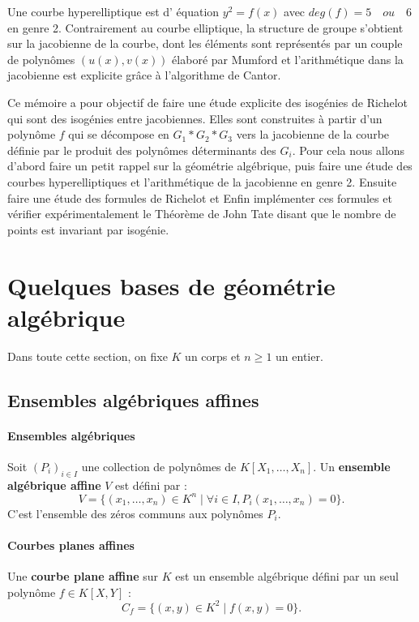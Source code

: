\documentclass[12pt,a4paper]{article}
\begin{document}
	Une courbe hyperelliptique est d' équation $y^2= f(x)$ avec $deg(f) = 5\quad ou \quad 6$ en genre 2. Contrairement au courbe elliptique, la structure de groupe s'obtient sur la jacobienne de la courbe, dont les éléments sont représentés par un couple de polynômes $(u(x),v(x))$ élaboré par Mumford et  l'arithmétique dans la jacobienne est explicite grâce \`a l'algorithme de Cantor.  
	
	Ce mémoire a pour objectif de faire une étude explicite des isogénies de Richelot qui sont des isogénies entre jacobiennes. Elles sont construites \`a partir d'un polynôme $f$ qui se décompose en $G_1*G_2*G_3$ vers la jacobienne de la courbe définie par le produit des polynômes déterminants des $G_i$. Pour cela nous allons d'abord faire un petit rappel sur la géométrie algébrique, puis faire une étude des courbes hyperelliptiques et l'arithmétique de la jacobienne en genre 2. Ensuite faire une étude des formules de Richelot et Enfin implémenter ces formules et vérifier expérimentalement le Théorème de John Tate disant que le nombre de points est invariant par isogénie.    
	\newpage
	\section{Quelques bases de géométrie algébrique}
	Dans toute cette section, on fixe $K$ un corps et $n \geq 1$ un entier.
	
	\subsection{Ensembles algébriques affines}
	
	\paragraph{Ensembles algébriques}
	Soit $(P_i)_{i \in I}$ une collection de polynômes de $K[X_1, \dots, X_n]$.
	Un \textbf{ensemble algébrique affine} $V$ est défini par :
	\[
	V = \{(x_1, \dots, x_n) \in K^n \mid \forall i \in I, P_i(x_1, \dots, x_n) = 0\}.
	\]
	C’est l’ensemble des zéros communs aux polynômes $P_i$.
	
	\paragraph{Courbes planes affines}
	Une \textbf{courbe plane affine} sur $K$ est un ensemble algébrique défini par un seul polynôme $f \in K[X, Y]$ :
	\[
	C_f = \{(x, y) \in K^2 \mid f(x, y) = 0\}.
	\]
	
\end{document}
